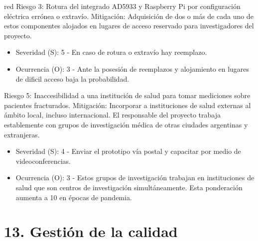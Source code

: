 \documentclass[11pt]{charter}
\begin{document}
\begin{consigna}{red}
Riesgo 3: Rotura del integrado AD5933  y Raspberry Pi por configuración eléctrica errónea o extravío.
Mitigación: Adquisición de dos o más de cada uno de estos componentes alojados en lugares de acceso reservado para investigadores del proyecto.
\begin{itemize}
\item Severidad (S): 5 - En caso de rotura o extravío hay reemplazo.
\item Ocurrencia (O): 3 - Ante la posesión de reemplazos y alojamiento en lugares de dificil acceso baja la probabilidad.
\end{itemize}

Riesgo 5: Inaccesibilidad a una institución de salud para tomar mediciones sobre pacientes fracturados.
Mitigación: Incorporar a instituciones de salud externas al ámbito local, incluso internacional. El responsable del proyecto trabaja establemente con grupos de investigación médica de otras ciudades argentinas y extranjeras.
\begin{itemize}
\item Severidad (S): 4 - Enviar el prototipo vía postal y capacitar por medio de videoconferencias.
\item Ocurrencia (O): 3 - Estos grupos de investigación trabajan en instituciones de salud que son centros de investigación simultáneamente. Esta ponderación aumenta a 10 en épocas de pandemia. 
\end{itemize}

\end{consigna}

\pagebreak
\section{13. Gestión de la calidad}
\label{sec:calidad}
\end{document}
